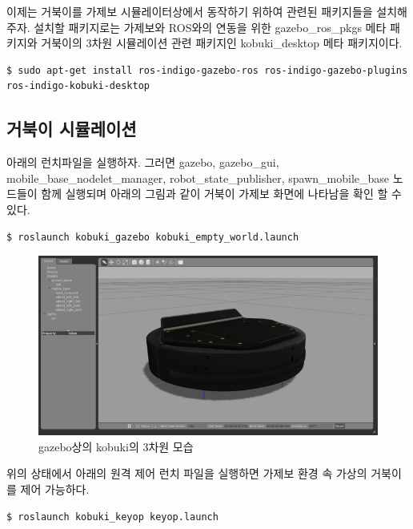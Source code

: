 이제는 거북이를 가제보 시뮬레이터상에서 동작하기 위하여 관련된 패키지들을 설치해주자. 설치할 패키지로는 가제보와 ROS와의 연동을 위한 gazebo\_ros\_pkgs 메타 패키지와 거북이의 3차원 시뮬레이션 관련 패키지인 kobuki\_desktop 메타 패키지이다.

\vspace{\baselineskip}
\begin{lstlisting}[language=ROS]
$ sudo apt-get install ros-indigo-gazebo-ros ros-indigo-gazebo-plugins ros-indigo-kobuki-desktop
\end{lstlisting}

\subsection{거북이 시뮬레이션}

아래의 런치파일을 실행하자. 그러면 gazebo, gazebo\_gui, mobile\_base\_nodelet\_manager, robot\_state\_publisher, spawn\_mobile\_base 노드들이 함께 실행되며 아래의 그림과 같이 거북이 가제보 화면에 나타남을 확인 할 수 있다.

\vspace{\baselineskip}
\begin{lstlisting}[language=ROS]
$ roslaunch kobuki_gazebo kobuki_empty_world.launch
\end{lstlisting}

\begin{figure}[h]
\centering\includegraphics[width=0.9\columnwidth]{pictures/chapter10/gazebo_kobuki.png}
\caption{gazebo상의 kobuki의 3차원 모습}
\end{figure}

위의 상태에서 아래의 원격 제어 런치 파일을 실행하면 가제보 환경 속 가상의 거북이를 제어 가능하다.

\vspace{\baselineskip}
\begin{lstlisting}[language=ROS]
$ roslaunch kobuki_keyop keyop.launch
\end{lstlisting}

